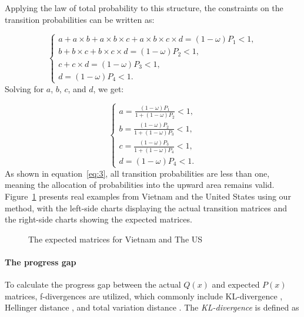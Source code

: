

Applying the law of total probability to this structure, the constraints on the transition probabilities can be written as:

\[
\begin{cases}
a + a \times b + a \times b \times c + a \times b \times c \times d = (1 - \omega) P_1 < 1, \\
b + b \times c + b \times c \times d = (1 - \omega) P_2 < 1, \\
c + c \times d = (1 - \omega) P_3 < 1, \\
d = (1 - \omega) P_4 < 1.
\end{cases}
\]
Solving for \( a \), \( b \), \( c \), and \( d \), we get:

\begin{equation}
\begin{cases}
\displaystyle a = \frac{(1 - \omega) P_1}{1 + (1 - \omega) P_2} < 1, \\
\displaystyle b = \frac{(1 - \omega) P_2}{1 + (1 - \omega) P_3} < 1, \\
\displaystyle c = \frac{(1 - \omega) P_3}{1 + (1 - \omega) P_4} < 1, \\
\displaystyle d = (1 - \omega) P_4 < 1.
\end{cases}
\label{eq:3}
\end{equation}
As shown in equation~\eqref{eq:3}, all transition probabilities are less than one, meaning the allocation of probabilities into the upward area remains valid. Figure~\ref{fig:VNM_USA} presents real examples from Vietnam and the United States using our method, with the left-side charts displaying the actual transition matrices and the right-side charts showing the expected matrices.

\begin{figure}[H]
    \centering
    \scalebox{0.55}{}
    \caption{The expected matrices for Vietnam and The US}
    \label{fig:VNM_USA}
\end{figure}



\paragraph{The progress gap}

To calculate the progress gap between the actual $Q(x)$ and expected $P(x)$ matrices, f-divergences are utilized, which commonly include KL-divergence \citep{csiszar1975divergence}, Hellinger distance \citep{jeffreys1946invariant}, and total variation distance \citep{chatterjee2008distances}. The \textit{KL-divergence} is defined as

